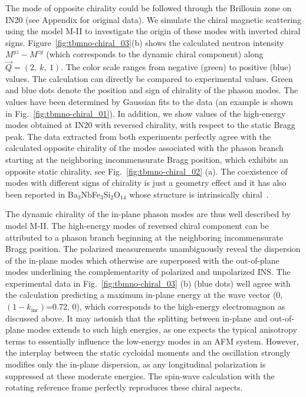 \documentclass[aps,prb,twocolumn,superscriptaddress,showpacs,floatfix]{revtex4-2}
\begin{document}
The mode of opposite chirality could be followed through the Brillouin zone on IN20 (see Appendix for original data).
We simulate the chiral magnetic scattering using the model M-II to investigate the origin of these modes with inverted chiral signs. Figure~\ref{fig:tbmno-chiral_03}(b) shows the calculated neutron intensity $M^{yz}-M^{zy}$ (which corresponds to the dynamic chiral component) along $\vec{Q}=(2,~k,~1)$.
The color scale ranges from negative (green) to positive (blue) values.
The calculation can directly be compared to experimental values.
Green and blue dots denote the position and sign of chirality of the phason modes.
The values have been determined by Gaussian fits to the data (an example is shown in Fig.~\ref{fig:tbmno-chiral_01}).
In addition, we show values of the high-energy modes obtained at IN20 with reversed chirality, with respect to the static Bragg peak.
The data extracted from both experiments perfectly agree with the calculated opposite chirality of the modes associated with the phason branch
starting at the neighboring incommensurate Bragg position, which exhibits an opposite static chirality, see Fig.~\ref{fig:tbmno-chiral_02} (a).  The coexistence of modes with different signs of chirality is just a geometry effect and it has also been reported in Ba$_3$NbFe$_3$Si$_2$O$_{14}$ whose structure is intrinsically chiral~\cite{Jensen2011,Loire2011}.

The dynamic chirality of the in-plane phason modes are thus well described by model M-II.
The high-energy modes of reversed chiral component can be attributed to a phason branch beginning at the neighboring incommensurate Bragg position.
The polarized measurements unambiguously reveal the dispersion of the in-plane modes which otherwise are
superposed with the out-of-plane modes underlining the complementarity of polarized and unpolarized INS.
The experimental data in Fig.~\ref{fig:tbmno-chiral_03} (b) (blue dots) well agree with the calculation predicting a maximum in-plane energy at the wave vector
(0, $(1-k_{\textrm{inc}})$=0.72, 0), which corresponds to the high-energy electromagnon as discussed above.
It may astonish that the splitting between in-plane and out-of-plane modes extends to such high energies,
as one expects the typical anisotropy terms to essentially influence the low-energy modes in an AFM system.
However, the interplay between the static cycloidal moments and the oscillation strongly modifies only the in-plane dispersion, as any longitudinal polarization is suppressed at these moderate energies. The spin-wave calculation with the rotating reference frame perfectly reproduces these chiral aspects.
\end{document}
